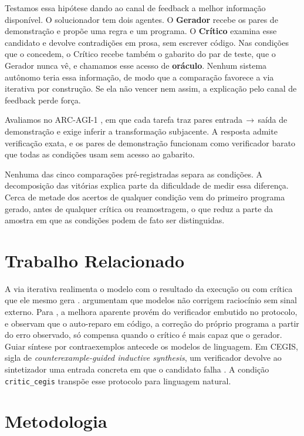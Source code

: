 \documentclass[letterpaper]{article} %
\begin{document}
Testamos essa hipótese dando ao canal de feedback a melhor informação
disponível. O solucionador tem dois agentes. O \textbf{Gerador} recebe os pares
de demonstração e propõe uma regra e um programa. O \textbf{Crítico} examina esse
candidato e devolve contradições em prosa, sem escrever código. Nas condições que
o concedem, o Crítico recebe também o gabarito do par de teste, que o Gerador
nunca vê, e chamamos esse acesso de \textbf{oráculo}. Nenhum sistema autônomo
teria essa informação, de modo que a comparação favorece a via iterativa por
construção. Se ela não vencer nem assim, a explicação pelo canal de feedback
perde força.

Avaliamos no ARC-AGI-1 \citep{chollet:19}, em que cada tarefa traz pares
entrada\,$\rightarrow$\,saída de demonstração e exige inferir a transformação
subjacente. A resposta admite verificação exata, e os pares de demonstração
funcionam como verificador barato que todas as condições usam sem acesso ao
gabarito.

Nenhuma das cinco comparações pré-registradas separa as condições. A decomposição
das vitórias explica parte da dificuldade de medir essa diferença. Cerca de
metade dos acertos de qualquer condição vem do primeiro programa gerado, antes de
qualquer crítica ou reamostragem, o que reduz a parte da amostra em que as
condições podem de fato ser distinguidas.

\section{Trabalho Relacionado}

A via iterativa realimenta o modelo com o resultado da execução \citep{chen:24}
ou com crítica que ele mesmo gera \citep{madaan:23,shinn:23}. \citet{huang:24}
argumentam que modelos não corrigem raciocínio sem sinal externo. Para
\citet{stechly:23}, a melhora aparente provém do verificador embutido no
protocolo, e \citet{olausson:24} observam que o auto-reparo em código, a correção
do próprio programa a partir do erro observado, só compensa quando o crítico é
mais capaz que o gerador. Guiar síntese por contraexemplos antecede os modelos de
linguagem. Em CEGIS, sigla de \emph{counterexample-guided inductive synthesis},
um verificador devolve ao sintetizador uma entrada concreta em que o candidato
falha \citep{solarlezama:06}. A condição \texttt{critic\_cegis} transpõe esse
protocolo para linguagem natural.

\section{Metodologia}
\end{document}
